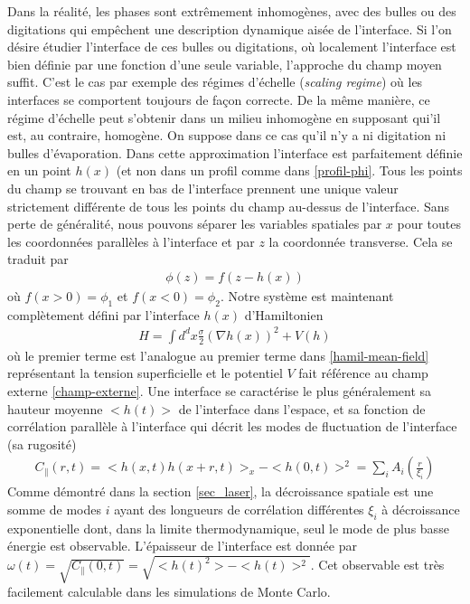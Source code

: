 Dans la réalité, les phases sont extrêmement inhomogènes, avec des bulles ou des digitations qui empêchent une description dynamique aisée de l'interface. Si l'on désire étudier l'interface de ces bulles ou digitations, où localement l'interface est bien définie par une fonction d'une seule variable, l'approche du champ moyen suffit. C'est le cas par exemple des régimes d'échelle (\textit{scaling regime}) où les interfaces se comportent toujours de façon correcte. De la même manière, ce régime d'échelle peut s'obtenir dans un milieu inhomogène en supposant qui'il est, au contraire, homogène. On suppose dans ce cas qu'il n'y a ni digitation ni bulles d'évaporation. Dans cette approximation l'interface est parfaitement définie en un point $h(x)$ (et non dans un profil comme dans \ref{profil-phi}. Tous les points du champ se trouvant en bas de l'interface prennent une unique valeur strictement différente de tous les points du champ au-dessus de l'interface. Sans perte de généralité, nous pouvons séparer les variables spatiales par $x$ pour toutes les coordonnées parallèles à l'interface et par $z$ la coordonnée transverse. Cela se traduit par
\begin{align}
    \phi(z) = f(z-h(x))
    \label{capillary-wave-theory}
\end{align}
où $f(x\greater 0) = \phi_1$ et $f(x\less 0) = \phi_2$. Notre système est maintenant complètement défini par l'interface $h(x)$ d'Hamiltonien
\begin{align}
    H = \int d^d x \frac{\sigma}{2} (\nabla h(x))^2 + V(h)
    \label{hamil-cwt}
\end{align}
où le premier terme est l'analogue au premier terme dans \ref{hamil-mean-field} représentant la tension superficielle et le potentiel $V$ fait référence au champ externe \ref{champ-externe}. 
Une interface se caractérise le plus généralement sa hauteur moyenne $<h(t)>$ de l'interface dans l'espace, et sa fonction de corrélation parallèle à l'interface qui décrit les modes de fluctuation de l'interface (sa rugosité)
\begin{align}
    C_\parallel(r,t) = <h(x,t)h(x+r,t)>_x - <h(0,t)>^2 = \sum_i A_i(\frac{r}{\xi_i}) 
\end{align}
Comme démontré dans la section \ref{sec_laser}, la décroissance spatiale est une somme de modes $i$ ayant des longueurs de corrélation différentes $\xi_i$ à décroissance exponentielle dont, dans la limite thermodynamique, seul le mode de plus basse énergie est observable. 
L'épaisseur de l'interface est donnée par $\omega(t) = \sqrt{C_\parallel(0,t)} = \sqrt{<h(t)^2> - <h(t)>^2}$. Cet observable est très facilement calculable dans les simulations de Monte Carlo.


